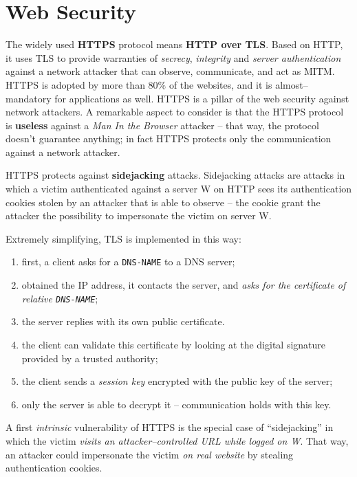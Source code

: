 \documentclass[10pt]{extbook}
\begin{document}
\chapter{Web Security}

The widely used \textbf{HTTPS} protocol means \textbf{HTTP over TLS}. Based on
HTTP, it uses TLS to provide warranties of \emph{secrecy}, \emph{integrity} and
\emph{server authentication} against a network attacker that can observe,
communicate, and act as MITM. HTTPS is adopted by more than $80\%$ of the
websites, and it is almost--mandatory for applications as well. HTTPS is a
pillar of the web security against network attackers. A remarkable aspect to
consider is that the HTTPS protocol is \textbf{useless} against a \emph{Man In
the Browser} attacker -- that way, the protocol doesn't guarantee anything; in
fact HTTPS protects only the communication against a network attacker.

HTTPS protects against \textbf{sidejacking} attacks. Sidejacking attacks are
attacks in which a victim authenticated against a server W on HTTP sees its
authentication cookies stolen by an attacker that is able to observe -- the
cookie grant the attacker the possibility to impersonate the victim on server
W.

Extremely simplifying, TLS is implemented in this way:
\begin{enumerate}
    \item first, a client asks for a \texttt{DNS-NAME} to a DNS server;
    \item obtained the IP address, it contacts the server, and \emph{asks for
        the certificate of relative \texttt{DNS-NAME}};
    \item the server replies with its own public certificate.
    \item the client can validate this certificate by looking at the digital
        signature provided by a trusted authority;
    \item the client sends a \emph{session key} encrypted with the public key
        of the server;
    \item only the server is able to decrypt it -- communication holds with this
        key.
\end{enumerate}

A first \emph{intrinsic} vulnerability of HTTPS is the special case of
``sidejacking'' in which the victim \emph{visits an attacker--controlled URL
while logged on W}. That way, an attacker could impersonate the victim \emph{on
real website} by stealing authentication cookies.
\end{document}
